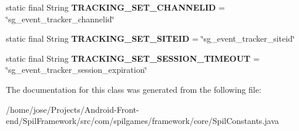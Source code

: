 \begin{DoxyCompactItemize}
\item 
\hypertarget{classcom_1_1spilgames_1_1framework_1_1core_1_1_spil_constants_a8589394f761c3e65607f117242a38a08}{static final String {\bfseries T\-R\-A\-C\-K\-I\-N\-G\-\_\-\-S\-E\-T\-\_\-\-C\-H\-A\-N\-N\-E\-L\-I\-D} = \char`\"{}sg\-\_\-event\-\_\-tracker\-\_\-channelid\char`\"{}}\label{classcom_1_1spilgames_1_1framework_1_1core_1_1_spil_constants_a8589394f761c3e65607f117242a38a08}

\item 
\hypertarget{classcom_1_1spilgames_1_1framework_1_1core_1_1_spil_constants_a94f174dc3c0c562279fc52232787610a}{static final String {\bfseries T\-R\-A\-C\-K\-I\-N\-G\-\_\-\-S\-E\-T\-\_\-\-S\-I\-T\-E\-I\-D} = \char`\"{}sg\-\_\-event\-\_\-tracker\-\_\-siteid\char`\"{}}\label{classcom_1_1spilgames_1_1framework_1_1core_1_1_spil_constants_a94f174dc3c0c562279fc52232787610a}

\item 
\hypertarget{classcom_1_1spilgames_1_1framework_1_1core_1_1_spil_constants_a5322e4375ea15647fed2c226615ce5cf}{static final String {\bfseries T\-R\-A\-C\-K\-I\-N\-G\-\_\-\-S\-E\-T\-\_\-\-S\-E\-S\-S\-I\-O\-N\-\_\-\-T\-I\-M\-E\-O\-U\-T} = \char`\"{}sg\-\_\-event\-\_\-tracker\-\_\-session\-\_\-expiration\char`\"{}}\label{classcom_1_1spilgames_1_1framework_1_1core_1_1_spil_constants_a5322e4375ea15647fed2c226615ce5cf}

\end{DoxyCompactItemize}


The documentation for this class was generated from the following file\-:\begin{DoxyCompactItemize}
\item 
/home/jose/\-Projects/\-Android-\/\-Front-\/end/\-Spil\-Framework/src/com/spilgames/framework/core/Spil\-Constants.\-java\end{DoxyCompactItemize}
